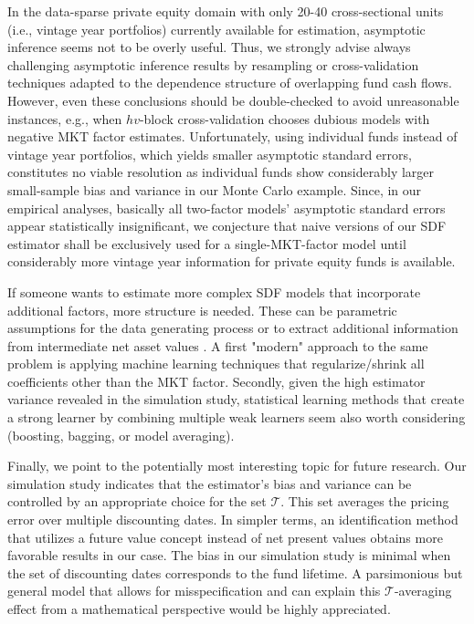 \documentclass[12pt]{article}
\begin{document}
In the data-sparse private equity domain with only 20-40 cross-sectional units (i.e., vintage year portfolios) currently available for estimation, asymptotic inference seems not to be overly useful.
Thus, we strongly advise always challenging asymptotic inference results by resampling or cross-validation techniques adapted to the dependence structure of overlapping fund cash flows.
However, even these conclusions should be double-checked to avoid unreasonable instances, e.g., when $hv$-block cross-validation chooses dubious models with negative MKT factor estimates.
Unfortunately, using individual funds instead of vintage year portfolios, which yields smaller asymptotic standard errors, constitutes no viable resolution as individual funds show considerably larger small-sample bias and variance in our Monte Carlo example.
Since, in our empirical analyses, basically all two-factor models' asymptotic standard errors appear statistically insignificant, we conjecture that naive versions of our SDF estimator shall be exclusively used for a single-MKT-factor model until considerably more vintage year information for private equity funds is available.

If someone wants to estimate more complex SDF models that incorporate additional factors, more structure is needed.
These can be parametric assumptions for the data generating process \citep{ACGP18} or to extract additional information from intermediate net asset values \citep{GSW19,BGG20}.
A first "modern" approach to the same problem is applying machine learning techniques that regularize/shrink all coefficients other than the MKT factor.
Secondly, given the high estimator variance revealed in the simulation study, statistical learning methods that create a strong learner by combining multiple weak learners seem also worth considering (boosting, bagging, or model averaging).


Finally, we point to the potentially most interesting topic for future research.
Our simulation study indicates that the estimator's bias and variance can be controlled by an appropriate choice for the set $\mathcal{T}$.
This set averages the pricing error over multiple discounting dates.
In simpler terms, an identification method that utilizes a future value concept instead of net present values obtains more favorable results in our case.
The bias in our simulation study is minimal when the set of discounting dates corresponds to the fund lifetime.
A parsimonious but general model that allows for misspecification and can explain this $\mathcal{T}$-averaging effect from a mathematical perspective would be highly appreciated.






\appendix

%
%
%

\end{document}
